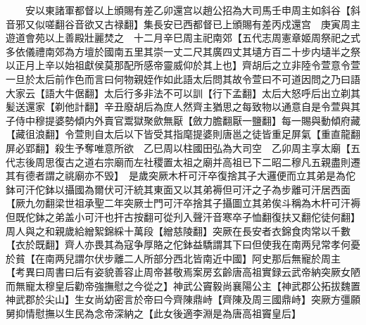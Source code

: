 　　安以東諸軍都督以上頒賜有差乙卯還宫以趙公招為大司馬壬申周主如斜谷【斜音邪又似嗟翻谷音欲又古禄翻】集長安已西都督已上頒賜有差丙戍還宫　庚寅周主遊道會苑以上善殿壯麗焚之　十二月辛巳周主祀南郊【五代志周憲章姬周祭祀之式多依儀禮南郊為方壇於國南五里其崇一丈二尺其廣四丈其壝方百二十步内壝半之祭以正月上辛以始祖獻侯莫那配所感帝靈威仰於其上也】齊胡后之立非陸令萱意令萱一旦於太后前作色而言曰何物親姪作如此語太后問其故令萱曰不可道因問之乃曰語大家云【語大牛倨翻】太后行多非法不可以訓【行下孟翻】太后大怒呼后出立剃其髪送還家【剃他計翻】辛丑廢胡后為庶人然齊主猶思之每致物以通意自是令萱與其子侍中穆提婆勢傾内外賣官鬻獄聚歛無厭【斂力膽翻厭一鹽翻】每一賜與動傾府藏【藏徂浪翻】令萱則自太后以下皆受其指麾提婆則唐邕之徒皆重足屏氣【重直龍翻屏必郢翻】殺生予奪唯意所欲　乙巳周以柱國田弘為大司空　乙卯周主享太廟【五代志後周思復古之道右宗廟而左社稷置太祖之廟并高祖已下二昭二穆凡五親盡則遷其有德者謂之祧廟亦不毁】　是歲突厥木杆可汗卒復捨其子大邏便而立其弟是為佗鉢可汗佗鉢以攝國為爾伏可汗統其東面又以其弟褥但可汗之子為步離可汗居西面【厥九勿翻梁世祖承聖二年突厥士門可汗卒捨其子攝圖立其弟俟斗稱為木杆可汗褥但既佗鉢之弟盖小可汗也扞古按翻可從刋入聲汗音寒卒子恤翻復扶又翻佗徒何翻】周人與之和親歲給繒絮錦綵十萬段【繒慈陵翻】突厥在長安者衣錦食肉常以千數【衣於既翻】齊人亦畏其為寇争厚賂之佗鉢益驕謂其下曰但使我在南两兒常孝何憂於貧【在南两兒謂尔伏步離二人所部分西北皆南近中國】阿史那后無寵於周主　【考異曰周書曰后有姿貌善容止周帝甚敬焉案房玄齡唐高祖實録云武帝納突厥女陋而無寵太穆皇后勸帝強撫慰之今從之】神武公竇毅尚襄陽公主【神武郡公拓拔魏置神武郡於尖山】生女尚幼密言於帝曰今齊陳鼎峙【齊陳及周三國鼎峙】突厥方彊願舅抑情慰撫以生民為念帝深納之【此女後適李淵是為唐高祖竇皇后】

